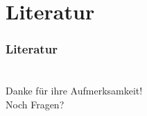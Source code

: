 \section{Literatur}
\begin{frame}[allowframebreaks]
  \frametitle{Literatur}
  \makebibliography
\end{frame}

\section*{}
{

  \begin{frame}
    \centering
    \LARGE
    Danke für ihre Aufmerksamkeit! \\[1.5cm]
    Noch Fragen?
  \end{frame}
}
